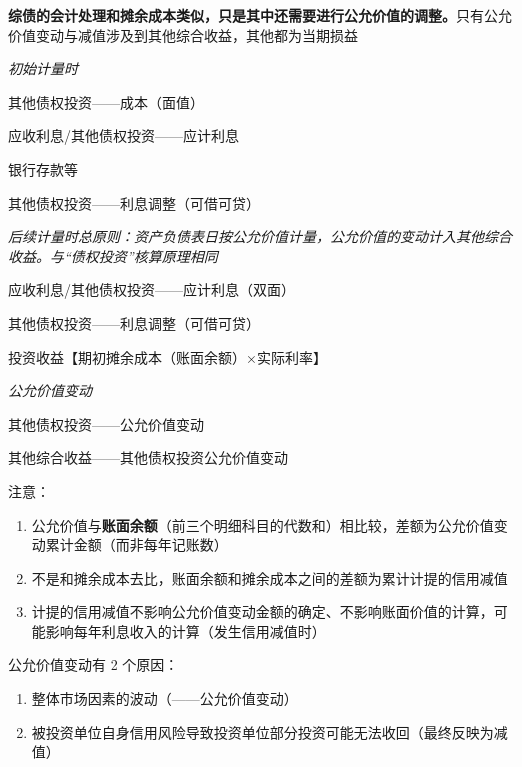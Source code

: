 \documentclass[UTF8,12pt]{ctexart}
\newenvironment{Dr}{%
	\begin{list}{}%
		{
			\setlength{\leftmargin}{2em}
			\setlength{\labelwidth}{2em}
			\setlength{\labelsep}{0pt}
			\setlength{\itemindent}{0pt}
			\setlength{\listparindent}{0pt}
			\setlength{\parsep}{0pt}
			\setlength{\topsep}{0pt}
		}
		\item[\textbf{借：}]
	}{%
	\end{list}
}
\newenvironment{Cr}{%
	\begin{list}{}%
		{
			\setlength{\leftmargin}{3em}
			\setlength{\labelwidth}{2em}
			\setlength{\labelsep}{0pt}
			\setlength{\itemindent}{0pt}
			\setlength{\listparindent}{0pt}
			\setlength{\parsep}{0pt}
			\setlength{\topsep}{0pt}
		}
		\item[\textbf{贷：}]
	}{%
	\end{list}
}
\numberwithin{equation}{section} %
\numberwithin{figure}{section}
\numberwithin{table}{section}
\begin{document}
	\textbf{综债的会计处理和摊余成本类似，只是其中还需要进行公允价值的调整。}只有公允价值变动与减值涉及到其他综合收益，其他都为当期损益
	
	\textit{初始计量时}
	
	\begin{Dr}
		其他债权投资——成本（面值）
		
		应收利息/其他债权投资——应计利息
	\end{Dr}
	\begin{Cr}
		银行存款等
		
		其他债权投资——利息调整（可借可贷）
	\end{Cr}

	\textit{后续计量时总原则：资产负债表日按公允价值计量，公允价值的变动计入其他综合收益。与“债权投资”核算原理相同}
	
	\begin{Dr}
		应收利息/其他债权投资——应计利息（双面）
		
		其他债权投资——利息调整（可借可贷）
	\end{Dr}
	\begin{Cr}
		投资收益【期初摊余成本（账面余额）×实际利率】
	\end{Cr}

	\textit{公允价值变动}
	
	\begin{Dr}
		其他债权投资——公允价值变动
	\end{Dr}
	\begin{Cr}
		其他综合收益——其他债权投资公允价值变动
	\end{Cr}
	
	注意：
	\begin{enumerate}
		\item 公允价值与\textbf{账面余额}（前三个明细科目的代数和）相比较，差额为公允价值变动累计金额（而非每年记账数）
		
		\item 不是和摊余成本去比，账面余额和摊余成本之间的差额为累计计提的信用减值
		
		\item 计提的信用减值不影响公允价值变动金额的确定、不影响账面价值的计算，可能影响每年利息收入的计算（发生信用减值时）
	\end{enumerate}
	
	
	
	公允价值变动有 2 个原因：
	\begin{enumerate}
		\item 整体市场因素的波动（——公允价值变动）
		
		\item 被投资单位自身信用风险导致投资单位部分投资可能无法收回（最终反映为减值）
	\end{enumerate}
	
\end{document}
